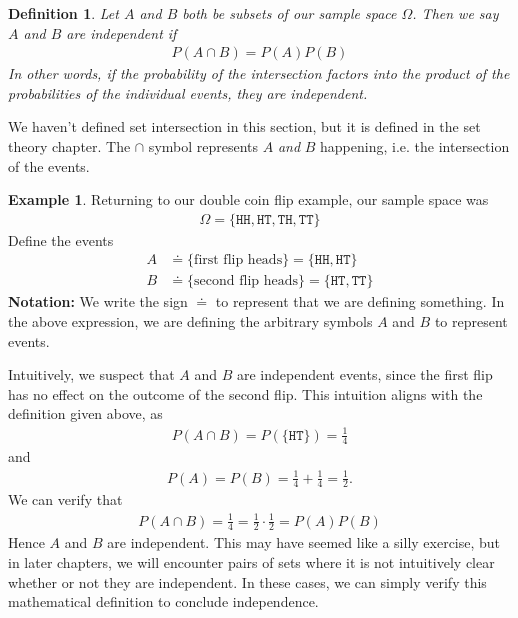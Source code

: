 \documentclass[11pt,letterpaper]{article}
\newcommand\hd{\texttt{H}}
\newcommand\tl{\texttt{T}}
\numberwithin{theorem}{section}
\newtheorem{definition}[theorem]{Definition}
\numberwithin{definition}{section}
\numberwithin{lemma}{section}
\numberwithin{corollary}{section}
\numberwithin{proposition}{section}
\theoremstyle{definition}
\numberwithin{remark}{section}
\numberwithin{claim}{section}
\numberwithin{observation}{section}
\numberwithin{fact}{section}
\numberwithin{assumption}{section}
\newtheorem{example}[theorem]{Example}
\numberwithin{example}{section}
\numberwithin{exercise}{section}
\begin{document}
\begin{definition}
Let $A$ and $B$ both be subsets of our sample space $\Omega$. Then we say $A$ and $B$ are independent if
\begin{align*}
P(A \cap B) = P(A) P(B)
\end{align*}
In other words, if the probability of the intersection factors into the product of the probabilities of the individual events, they are independent.
\end{definition}
We haven't defined set intersection in this section, but it is defined in the set theory chapter. The $\cap$ symbol represents $A$ \textit{and} $B$ happening, i.e. the intersection of the events.

\begin{example}
Returning to our double coin flip example, our sample space was
\begin{align*}
\Omega = \{\hd \hd, \hd \tl, \tl \hd, \tl \tl\}
\end{align*}
Define the events 
\begin{align*}
A &\doteq \{\text{first flip heads}\} = \{\hd \hd, \hd \tl\} \\
B &\doteq \{\text{second flip heads}\} = \{\hd \tl, \tl \tl\}
\end{align*}
\textbf{Notation:} We write the sign $\doteq$ to represent that we are defining something. In the above expression, we are defining the arbitrary symbols $A$ and $B$ to represent events.

Intuitively, we suspect that $A$ and $B$ are independent events, since the first flip has no effect on the outcome of the second flip. This intuition aligns with the definition given above, as
\begin{align*}
P(A \cap B) = P(\{\hd \tl\}) = \frac{1}{4}
\end{align*}
and
\begin{align*}
P(A) = P(B) = \frac{1}{4} + \frac{1}{4} = \frac{1}{2}.
\end{align*}
We can verify that
\begin{align*}
P(A \cap B) = \frac{1}{4} = \frac{1}{2} \cdot \frac{1}{2} = P(A) P(B)
\end{align*}
Hence $A$ and $B$ are independent. This may have seemed like a silly exercise, but in later chapters, we will encounter pairs of sets where it is not intuitively clear whether or not they are independent. In these cases, we can simply verify this mathematical definition to conclude independence.

\end{example}
\end{document}
